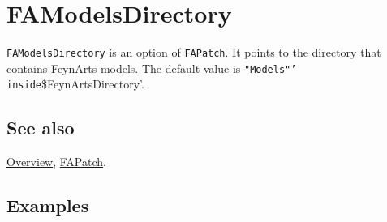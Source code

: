 \documentclass[../FeynCalcManual.tex]{subfiles}
\begin{document}
\hypertarget{famodelsdirectory}{%
\section{FAModelsDirectory}\label{famodelsdirectory}}

\texttt{FAModelsDirectory} is an option of \texttt{FAPatch}. It points
to the directory that contains FeynArts models. The default value is
\texttt{"Models"' inside}\$FeynArtsDirectory'.

\subsection{See also}

\hyperlink{toc}{Overview}, \hyperlink{fapatch}{FAPatch}.

\subsection{Examples}
\end{document}

